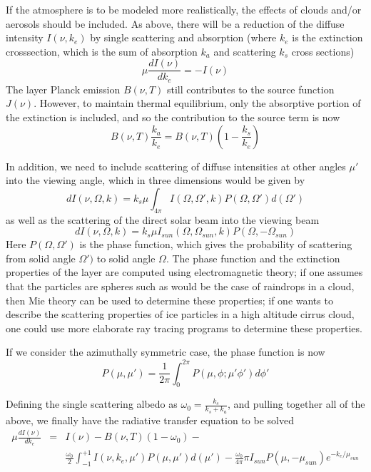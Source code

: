 \documentclass[11pt]{article}
\begin{document}
If the atmosphere is to be modeled more realistically, the effects of 
clouds and/or aerosols should be included. As above, there will be 
a reduction of the diffuse intensity $I(\nu,k_{e})$ by single scattering and
absorption (where $k_{e}$ is the extinction crosssection, which is the sum 
of absorption $k_{a}$ and scattering $k_{s}$ cross sections) 
\cite{lio:80,goo:89}
\[
\mu \frac{dI(\nu)}{dk_{e}} = -I(\nu)
\]
The layer Planck emission $B(\nu,T)$ still contributes to the source function 
$J(\nu)$. However, to maintain thermal equilibrium, only the absorptive 
portion of the extinction is included, and so the contribution to the
source term is now
\[
B(\nu,T) \frac{k_{a}}{k_{e}} = B(\nu,T) \left(1 - \frac{k_{s}}{k_{e}} \right) 
\]

In addition, we need to include scattering of diffuse intensities at 
other angles $\mu\prime$ into the viewing angle, which in three dimensions 
would be given by \cite{lio:80,goo:89}
\[
dI(\nu,\Omega,k) = k_{s} \mu \int_{4\pi} I(\Omega,\Omega\prime,k) 
P(\Omega,\Omega\prime) d(\Omega\prime)
\]
as well as the scattering of the direct solar beam into the viewing beam
\cite{lio:80,goo:89}
\[
dI(\nu,\Omega,k) = k_{s} \mu I_{sun}(\Omega,\Omega_{sun},k) 
P(\Omega,-\Omega_{sun}) 
\]
Here $P(\Omega,\Omega\prime)$ is the phase function, which gives the 
probability of scattering from solid angle $\Omega\prime)$ to solid angle
$\Omega$. The phase function and the extinction properties of the layer are
computed using electromagnetic theory; if one assumes that the particles are
spheres such as would be the case of raindrops in a cloud, then Mie theory 
\cite{van:82,lio:80,boh:98} can be used to determine these properties; if
one wants to describe the scattering properties of ice particles in a high
altitude cirrus cloud, one could use more elaborate ray tracing programs to 
determine these properties. 

If we consider  the azimuthally symmetric case, the phase function is now 
\cite{lio:80}
\[
P(\mu,\mu\prime) =  \frac{1}{2\pi} \int_{0}^{2\pi} 
P(\mu,\phi;\mu\prime \phi\prime) d\phi\prime
\]

Defining the single scattering albedo as
 $\omega_{0} = \frac{k_{s}}{k_{s}+k_{a}}$, and pulling together all of
the above, we finally have the radiative transfer equation to be solved 
\cite{lio:80,goo:89}
\[
\begin{array}{ccc}
\mu \frac{dI(\nu)}{dk_{e}} & = & I(\nu) - B(\nu,T)(1-\omega_{0}) - \\
& & 
\frac{\omega_{0}}{2}\int_{-1}^{+1} I(\nu,k_{e},\mu\prime) P(\mu,\mu\prime)
d(\mu\prime) - 
\frac{\omega_{0}}{4\pi} \pi I_{sun} P(\mu,-\mu_{sun}) e^{-k_{e}/\mu_{sun}} 
\end{array}
\]
\end{document}

